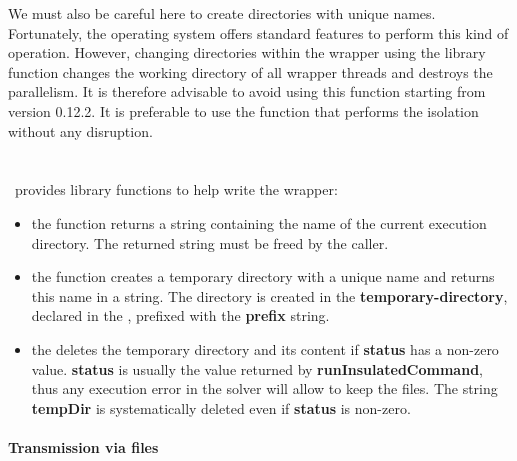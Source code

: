 We must also be careful here to create directories with unique names. Fortunately, the operating system offers standard features to perform this kind of operation. However, changing directories within the wrapper using the library function  changes the working directory of all wrapper threads and destroys the parallelism. It is therefore advisable to avoid using this function starting from version 0.12.2. It is preferable to use the  function that performs the isolation without any disruption.
\ \\
\ \\
\ \\
\OT\ provides library functions to help write the wrapper:
\begin{itemize}
\item the  function returns a string containing the name of the current execution directory. The returned string must be freed by the caller.
\item the  function creates a temporary directory with a unique name and returns this name in a string. The directory is created in the {\bf temporary-directory}, declared in the , prefixed with the {\bf prefix} string.
\item the  deletes the temporary directory and its content if {\bf status} has a non-zero value. {\bf status} is usually the value returned by {\bf runInsulatedCommand}, thus any execution error in the solver will allow to keep the files. The string {\bf tempDir} is systematically deleted even if {\bf status} is non-zero.
\end{itemize}

\paragraph{Transmission via files}

